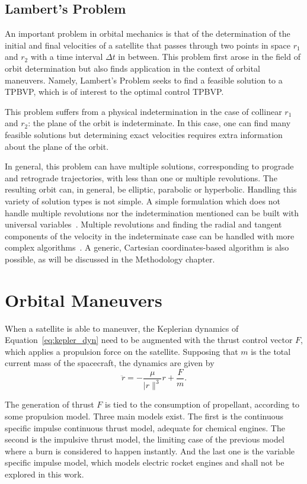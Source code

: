 \subsection{Lambert's Problem}

An important problem in orbital mechanics is that of the determination of the initial and final velocities of a satellite that passes through two points in space \(r_1\) and \(r_2\) with a time interval \(\Delta t\) in between. This problem first arose in the field of orbit determination but also finds application in the context of orbital maneuvers. Namely, Lambert's Problem seeks to find a feasible solution to a TPBVP, which is of interest to the optimal control TPBVP. 

This problem suffers from a physical indetermination in the case of collinear \(r_1\) and \(r_2\): the plane of the orbit is indeterminate. In this case, one can find many feasible solutions but determining exact velocities requires extra information about the plane of the orbit.\

In general, this problem can have multiple solutions, corresponding to prograde and retrograde trajectories, with less than one or multiple revolutions. The resulting orbit can, in general, be elliptic, parabolic or hyperbolic. Handling this variety of solution types is not simple. A simple formulation which does not handle multiple revolutions nor the indetermination mentioned can be built with universal variables~\cite{curtis2015orbital}. Multiple revolutions and finding the radial and tangent components of the velocity in the indeterminate case can be handled with more complex algorithms~\cite{sukhanov}. A generic, Cartesian coordinates-based algorithm is also possible, as will be discussed in the Methodology chapter.


\section{Orbital Maneuvers}

When a satellite is able to maneuver, the Keplerian dynamics of Equation~\eqref{eq:kepler_dyn} need to be augmented with the thrust control vector \(F\), which applies a propulsion force on the satellite. Supposing that \(m\) is the total current mass of the spacecraft, the dynamics are given by
\begin{equation}
    \ddot r = -\frac{\mu}{\lvert r \rVert^3}r + \frac{F}{m}.
\end{equation}

The generation of thrust \(F\) is tied to the consumption of propellant, according to some propulsion model. Three main models exist. The first is the continuous specific impulse continuous thrust model, adequate for chemical engines. The second is the impulsive thrust model, the limiting case of the previous model where a burn is considered to happen instantly. And the last one is the variable specific impulse model, which models electric rocket engines and shall not be explored in this work.

